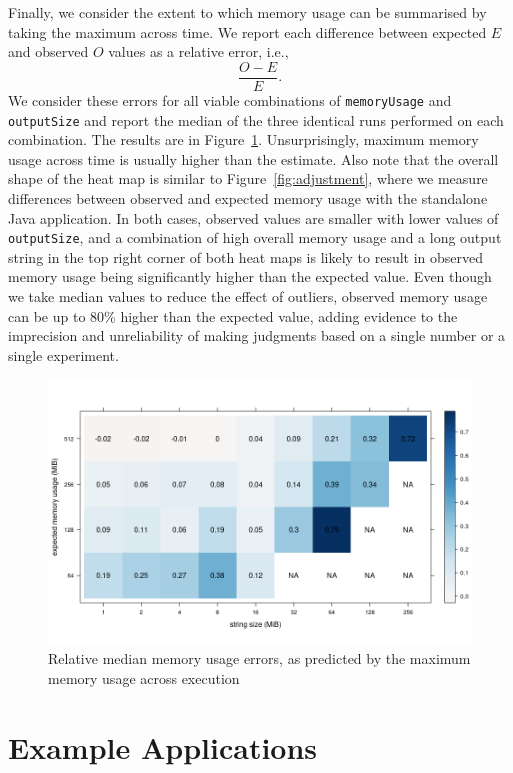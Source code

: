 \documentclass{article}
\begin{document}
Finally, we consider the extent to which memory usage can be summarised by
taking the maximum across time. We report each difference between expected $E$
and observed $O$ values as a relative error, i.e.,
\[
  \frac{O - E}{E}.
\]
We consider these errors for all viable combinations of \texttt{memoryUsage} and
\texttt{outputSize} and report the median of the three identical runs performed
on each combination. The results are in Figure~\ref{fig:relative_errors}.
Unsurprisingly, maximum memory usage across time is usually higher than the
estimate. Also note that the overall shape of the heat map is similar to
Figure~\ref{fig:adjustment}, where we measure differences between observed and
expected memory usage with the standalone Java application. In both cases,
observed values are smaller with lower values of \texttt{outputSize}, and a
combination of high overall memory usage and a long output string in the top
right corner of both heat maps is likely to result in observed memory usage
being significantly higher than the expected value. Even though we take median
values to reduce the effect of outliers, observed memory usage can be up to 80\%
higher than the expected value, adding evidence to the imprecision and
unreliability of making judgments based on a single number or a single
experiment.

\begin{figure}
  \centering
  \includegraphics[width=\textwidth]{../plots/relative_median_errors.png}
  \caption{Relative median memory usage errors, as predicted by the maximum
    memory usage across execution}
  \label{fig:relative_errors}
\end{figure}

\section{Example Applications}
\end{document}
